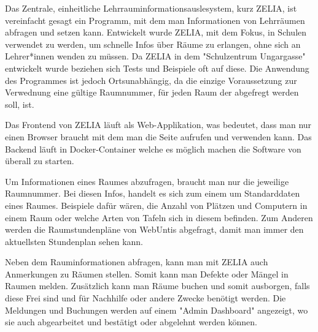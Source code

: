 

Das Zentrale, einheitliche Lehrrauminformationsauslesystem, kurz ZELIA, ist vereinfacht gesagt ein Programm, mit dem man Informationen von Lehrräumen abfragen und setzen kann. Entwickelt wurde ZELIA, mit dem Fokus, in Schulen verwendet zu werden, um schnelle Infos über Räume zu erlangen, ohne sich an Lehrer*innen wenden zu müssen. Da ZELIA in dem "Schulzentrum Ungargasse" entwickelt wurde beziehen sich Tests und Beispiele oft auf diese. Die Anwendung des Programmes ist jedoch Ortsunabhängig, da die einzige Voraussetzung zur Verwednung eine gültige Raumnummer, für jeden Raum der abgefregt werden soll, ist. 

Das Frontend von ZELIA läuft als Web-Applikation, was bedeutet, dass man nur einen Browser braucht mit dem man die Seite aufrufen und verwenden kann. Das Backend läuft in Docker-Container welche es möglich machen die Software von überall zu starten.

Um Informationen eines Raumes abzufragen, braucht man nur die jeweilige Raumnummer. Bei diesen Infos, handelt es sich zum einem um Standarddaten eines Raumes. Beispiele dafür wären, die Anzahl von Plätzen und Computern in einem Raum oder welche Arten von Tafeln sich in diesem befinden. Zum Anderen werden die Raumstundenpläne von WebUntis abgefragt, damit man immer den aktuellsten Stundenplan sehen kann.

Neben dem Rauminformationen abfragen, kann man mit ZELIA auch Anmerkungen zu Räumen stellen. Somit kann man Defekte oder Mängel in Raumen melden. Zusätzlich kann man Räume buchen und somit ausborgen, falls diese Frei sind und für Nachhilfe oder andere Zwecke benötigt werden. Die Meldungen und Buchungen werden auf einem "Admin Dashboard" angezeigt, wo sie auch abgearbeitet und bestätigt oder abgelehnt werden können. 

